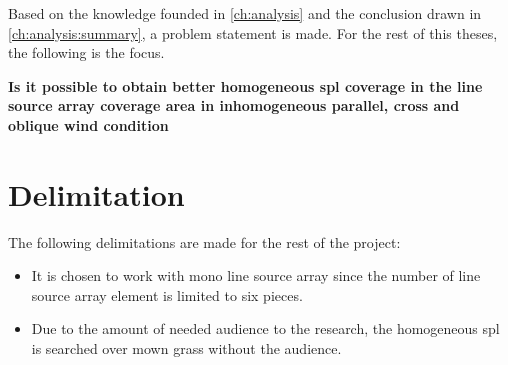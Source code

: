 Based on the knowledge founded in \autoref{ch:analysis} and the conclusion drawn in \autoref{ch:analysis:summary}, a problem statement is made. For the rest of this theses, the following is the focus.


\textbf{Is it possible to obtain better homogeneous \gls{spl} coverage in the line source array coverage area in inhomogeneous parallel, cross and oblique wind condition}



\section{Delimitation}
The following delimitations are made for the rest of the project:

\begin{itemize}
\item It is chosen to work with mono line source array since the number of line source array element is limited to six pieces.
\item Due to the amount of needed audience to the research, the homogeneous \gls{spl} is searched over mown grass without the audience.
\end{itemize}